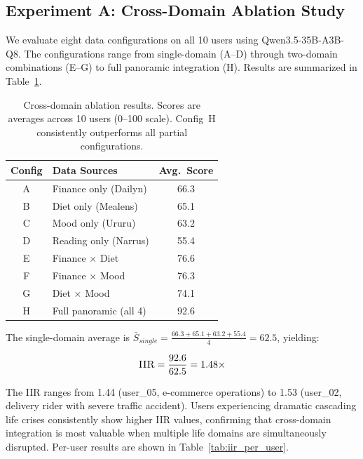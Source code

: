 \documentclass[11pt,a4paper]{article}
\newcommand{\iir}{\textsc{IIR}}
\newcommand{\appname}[1]{\textsf{#1}}
\begin{document}
\subsection{Experiment A: Cross-Domain Ablation Study}
\label{sec:results:ablation}

We evaluate eight data configurations on all 10 users using
Qwen3.5-35B-A3B-Q8. The configurations range from single-domain (A--D)
through two-domain combinations (E--G) to full panoramic integration (H).
Results are summarized in Table~\ref{tab:ablation}.

\begin{table}[H]
\centering
\caption{Cross-domain ablation results. Scores are averages across 10 users
(0--100 scale). Config~H consistently outperforms all partial configurations.}
\label{tab:ablation}
\begin{tabular}{@{}clc@{}}
\toprule
\textbf{Config} & \textbf{Data Sources} & \textbf{Avg.\ Score} \\
\midrule
A & Finance only (\appname{Dailyn})   & 66.3 \\
B & Diet only (\appname{Mealens})     & 65.1 \\
C & Mood only (\appname{Ururu})       & 63.2 \\
D & Reading only (\appname{Narrus})   & 55.4 \\
\midrule
E & Finance $\times$ Diet             & 76.6 \\
F & Finance $\times$ Mood             & 76.3 \\
G & Diet $\times$ Mood                & 74.1 \\
\midrule
H & Full panoramic (all 4)            & 92.6 \\
\bottomrule
\end{tabular}
\end{table}

The single-domain average is $\bar{S}_{single} = \frac{66.3 + 65.1 + 63.2 + 55.4}{4} = 62.5$, yielding:

\begin{equation}
\iir{} = \frac{92.6}{62.5} = 1.48\times
\end{equation}

The \iir{} ranges from 1.44 (user\_05, e-commerce operations) to 1.53
(user\_02, delivery rider with severe traffic accident). Users experiencing
dramatic cascading life crises consistently show higher \iir{} values,
confirming that cross-domain integration is most valuable when multiple
life domains are simultaneously disrupted. Per-user results are shown
in Table~\ref{tab:iir_per_user}.
\end{document}
